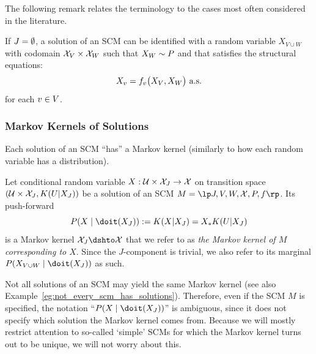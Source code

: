 The following remark relates the terminology to the cases most often considered in the literature.
\begin{Rem}
  If $J = \emptyset$, a solution of an SCM can be identified with a random variable 
  $X_{V \cup W}$ with codomain $\mathcal{X}_{V} \times \mathcal{X}_{W}$ such that $X_{W} \sim P$ and that
  satisfies the structural equations:
  \begin{equation}\label{eq:scm_structural_equations_componentwise}
    X_v = f_v\big(X_{V}, X_{W}\big) \text{ a.s.}
  \end{equation}
  for each $v \in V$.
\end{Rem}

\subsubsection{Markov Kernels of Solutions}

Each solution of an SCM ``has'' a Markov kernel (similarly to how each random variable has a distribution).
\begin{Not}\label{def:scm_kernels}
  Let conditional random variable $X : \mathcal{U} \times \mathcal{X}_{J} \to \mathcal{X}$ on transition space $(\mathcal{U} \times \mathcal{X}_{J}, K(U|X_{J}))$ be a solution of an SCM
  $M = \lt \Sin, \Send, \Srnd, \CX, P, f \rt$.
  Its push-forward 
  $$P(X \mid \doit(X_J)) := K(X|\XJ) = X_* K(U|X_J)$$
  is a Markov kernel $\CXJ \dshto \CX$ that we refer to as \emph{the Markov kernel of $M$ corresponding to $X$}.
  Since the $J$-component is trivial, we also refer to its marginal $P(X_{V\cup W}\mid \doit(\XJ))$ as such.
\end{Not}

Not all solutions of an SCM may yield the same Markov kernel (see also Example~\ref{eg:not_every_scm_has_solutions}).
Therefore, even if the SCM $M$ is specified, the notation ``$P(X \mid \doit(X_J))$'' is ambiguous, since it does not specify which solution the Markov kernel comes from. 
Because we will mostly restrict attention to so-called `simple' SCMs for which the Markov kernel turns out to be unique, we will not worry about this.

